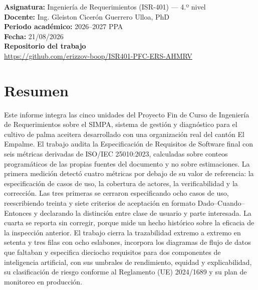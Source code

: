 \documentclass[11pt,letterpaper]{article}
\begin{document}
\begin{titlepage}
{\normalsize\textbf{Asignatura:} Ingeniería de Requerimientos (ISR-401) --- 4.º nivel}\\[0.2cm]
{\normalsize\textbf{Docente:} Ing. Gleiston Cicerón Guerrero Ulloa, PhD}\\[0.2cm]
{\normalsize\textbf{Periodo académico:} 2026--2027 PPA}\\[0.2cm]
{\normalsize\textbf{Fecha:} 21/08/2026}\\[1.2cm]

{\normalsize\textbf{Repositorio del trabajo}}\\[0.2cm]
{\small\url{https://github.com/erizzov-boop/ISR401-PFC-ERS-AHMRV}}

\end{titlepage}

\section*{Resumen}

Este informe integra las cinco unidades del Proyecto Fin de Curso de Ingeniería de Requerimientos
sobre el SIMPA, sistema de gestión y diagnóstico para el cultivo de palma aceitera desarrollado con
una organización real del cantón El Empalme. El trabajo audita la Especificación de Requisitos de
Software final con seis métricas derivadas de ISO/IEC 25010:2023, calculadas sobre conteos
programáticos de las propias fuentes del documento y no sobre estimaciones. La primera medición
detectó cuatro métricas por debajo de su valor de referencia: la especificación de casos de uso, la
cobertura de actores, la verificabilidad y la corrección. Las tres primeras se cerraron especificando
ocho casos de uso, reescribiendo treinta y siete criterios de aceptación en formato Dado--Cuando--Entonces
y declarando la distinción entre clase de usuario y parte interesada. La cuarta se reporta sin
corregir, porque mide un hecho histórico sobre la eficacia de la inspección anterior. El trabajo
cierra la trazabilidad extremo a extremo en setenta y tres filas con ocho eslabones, incorpora los
diagramas de flujo de datos que faltaban y especifica dieciocho requisitos para dos componentes de
inteligencia artificial, con sus umbrales de rendimiento, equidad y explicabilidad, su clasificación
de riesgo conforme al Reglamento (UE) 2024/1689 y su plan de monitoreo en producción.
\end{document}
